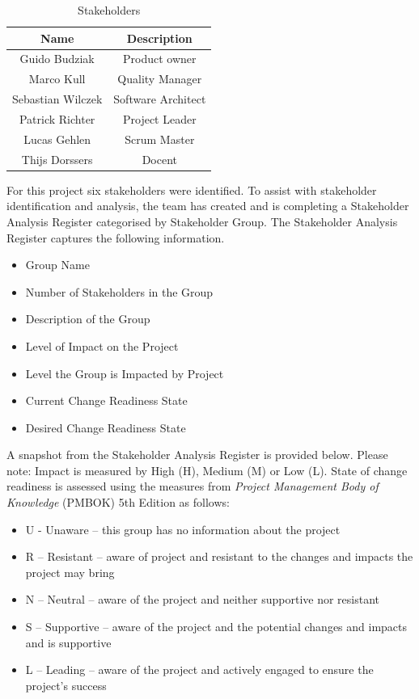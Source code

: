 \begin{table}[H]
    \centering
    \begin{tabular}{|c|c|}
        \hline
        \cellcolor{gray}Name & \cellcolor{gray}Description \\ \hline
        Guido Budziak & Product owner \\ \hline
        Marco Kull & Quality Manager \\ \hline
        Sebastian Wilczek & Software Architect \\ \hline
        Patrick Richter & Project Leader \\ \hline
        Lucas Gehlen & Scrum Master \\ \hline
        Thijs Dorssers & Docent \\ \hline
    \end{tabular}
    \caption{Stakeholders}
    \label{tab:stakeholders}
\end{table}

For this project six stakeholders were identified. To assist with stakeholder identification and analysis, the team has created and is completing a Stakeholder Analysis Register categorised by Stakeholder Group. The Stakeholder Analysis Register captures the following information.

\begin{itemize}
    \item Group Name
    \item Number of Stakeholders in the Group
    \item Description of the Group
    \item Level of Impact on the Project
    \item Level the Group is Impacted by Project
    \item Current Change Readiness State
    \item Desired Change Readiness State
\end{itemize}

A snapshot from the Stakeholder Analysis Register is provided below.
Please note: Impact is measured by High (H), Medium (M) or Low (L).  State of change readiness is assessed using the measures from \textit{Project Management Body of Knowledge} (PMBOK) 5th Edition  as follows: 

\begin{itemize}
    \item U - Unaware – this group has no information about the project
    \item R – Resistant – aware of project and resistant to the changes and impacts the project may bring
    \item N – Neutral – aware of the project and neither supportive nor resistant
    \item S – Supportive – aware of the project and the potential changes and impacts and is supportive 
    \item L – Leading – aware of the project and actively engaged to ensure the project’s success
\end{itemize}


